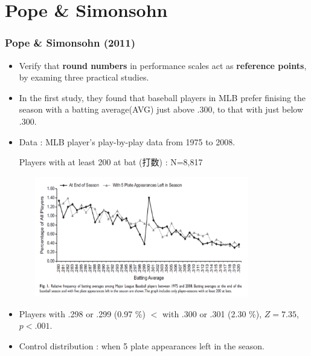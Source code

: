 \documentclass[dvipdfmx,12pt]{beamer}
\begin{document}
\section{Pope \& Simonsohn}
\begin{frame}\frametitle{Pope \& Simonsohn (2011)}

\begin{itemize}

\item Verify that \textbf{round numbers} in performance scales act as \textbf{reference points}, by examing three practical studies.

\item In the first study, they found that baseball players in MLB prefer finising the season with a batting average(AVG) just above .300, to that with just below .300.

\item Data : MLB player's play-by-play data from 1975 to 2008.

Players with at least 200 at bat (打数) : N=8,817

\end{itemize}

\end{frame}

\begin{frame}
\begin{center}

\includegraphics[width=12cm,height=5.25cm]{Pope_Simonsohn_F1.pdf}

\end{center}

 \begin{itemize}
 
 \item Players with .298 or .299 (0.97 \%) $<$ with .300 or .301 (2.30 \%), $Z=7.35$, $p<.001$.
 
 \item Control distribution : when 5 plate appearances left in the season.
 

 \end{itemize}

\end{frame}
\end{document}
